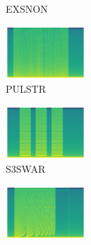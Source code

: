 \begin{figure}[H]
{\begin{subfigure}{0.23\textwidth}
{{        }\hspace*{0.75cm}%
      }%
      \caption*{EXSNON}
    \end{subfigure}
    \begin{subfigure}{0.23\textwidth}
      \includegraphics[width=3cm]{tempest_sounds/buttons/PULSTR.raw-button.png}%
      \caption*{PULSTR}
    \end{subfigure}
    \begin{subfigure}{0.23\textwidth}
      \includegraphics[width=3cm]{tempest_sounds/buttons/S3SWAR.raw-button.png}%
      \caption*{S3SWAR}
    \end{subfigure}
    \begin{subfigure}{0.23\textwidth}
      \includegraphics[width=3cm]{tempest_sounds/buttons/SAUSON.raw-button.png}%
\end{subfigure}}
\end{figure}
